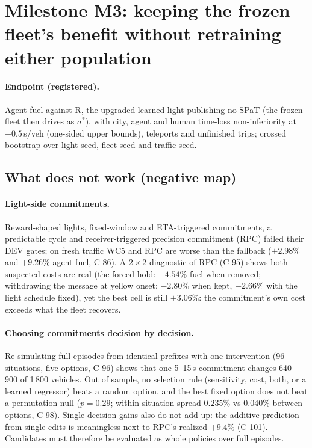 \documentclass[11pt]{article}
\begin{document}
\section{Milestone M3: keeping the frozen fleet's benefit without retraining either population}
\paragraph{Endpoint (registered).} Agent fuel against R, the upgraded learned light publishing no SPaT (the frozen fleet then drives as
$\sigma^*$), with city, agent and human time-loss non-inferiority at $+0.5$\,s/veh (one-sided upper bounds), teleports and unfinished
trips; crossed bootstrap over light seed, fleet seed and traffic seed.

\subsection{What does not work (negative map)}
\paragraph{Light-side commitments.} Reward-shaped lights, fixed-window and ETA-triggered commitments, a predictable cycle and
receiver-triggered precision commitment (RPC) failed their DEV gates; on fresh traffic WC5 and RPC are worse than the fallback
($+2.98\%$ and $+9.26\%$ agent fuel, C-86). A $2\times2$ diagnostic of RPC (C-95) shows both suspected costs are real (the forced hold:
$-4.54\%$ fuel when removed; withdrawing the message at yellow onset: $-2.80\%$ when kept, $-2.66\%$ with the light schedule fixed), yet the best
cell is still $+3.06\%$: the commitment's own cost exceeds what the fleet recovers.
\paragraph{Choosing commitments decision by decision.} Re-simulating full episodes from identical prefixes with one intervention
(96 situations, five options, C-96) shows that one 5--15\,s commitment changes 640--900 of 1\,800 vehicles. Out of sample, no selection
rule (sensitivity, cost, both, or a learned regressor) beats a random option, and the best fixed option does not beat a permutation null
($p=0.29$; within-situation spread $0.235\%$ vs $0.040\%$ between options, C-98). Single-decision gains also do not add up: the
additive prediction from single edits is meaningless next to RPC's realized $+9.4\%$ (C-101). Candidates must therefore be evaluated as
whole policies over full episodes.
\end{document}

